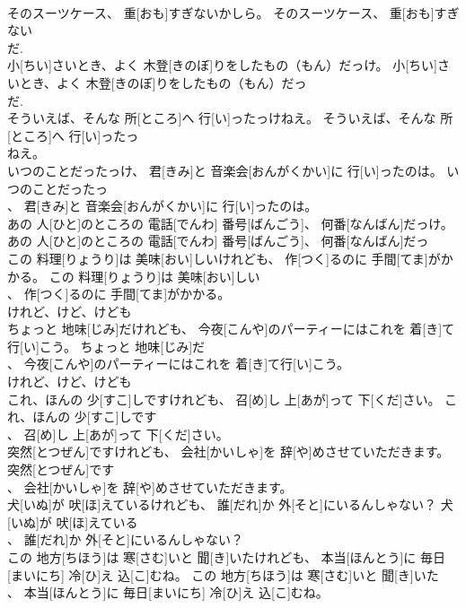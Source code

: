 \documentclass[8pt]{extreport}
\begin{document}
\begin{CJK}{UTF8}{min}
\\	そのスーツケース、 重[おも]すぎないかしら。	そのスーツケース、 重[おも]すぎない
\\	だ. 
\\	小[ちい]さいとき、よく 木登[きのぼ]りをしたもの（もん）だっけ。	小[ちい]さいとき、よく 木登[きのぼ]りをしたもの（もん）だっ
\\	だ. 
\\	そういえば、そんな 所[ところ]へ 行[い]ったっけねえ。	そういえば、そんな 所[ところ]へ 行[い]ったっ
\\	ねえ。	
\\	いつのことだったっけ、 君[きみ]と 音楽会[おんがくかい]に 行[い]ったのは。	いつのことだったっ
\\	、 君[きみ]と 音楽会[おんがくかい]に 行[い]ったのは。	
\\	あの 人[ひと]のところの 電話[でんわ] 番号[ばんごう]、 何番[なんばん]だっけ。	あの 人[ひと]のところの 電話[でんわ] 番号[ばんごう]、 何番[なんばん]だっ
\\	この 料理[りょうり]は 美味[おい]しいけれども、 作[つく]るのに 手間[てま]がかかる。	この 料理[りょうり]は 美味[おい]しい
\\	、 作[つく]るのに 手間[てま]がかかる。	
\\	けれど、けど、けども
\\	ちょっと 地味[じみ]だけれども、 今夜[こんや]のパーティーにはこれを 着[き]て行[い]こう。	ちょっと 地味[じみ]だ
\\	、 今夜[こんや]のパーティーにはこれを 着[き]て行[い]こう。	
\\	けれど、けど、けども
\\	これ、ほんの 少[すこ]しですけれども、 召[め]し 上[あが]って 下[くだ]さい。	これ、ほんの 少[すこ]しです
\\	、 召[め]し 上[あが]って 下[くだ]さい。	
\\	突然[とつぜん]ですけれども、 会社[かいしゃ]を 辞[や]めさせていただきます。	突然[とつぜん]です
\\	、 会社[かいしゃ]を 辞[や]めさせていただきます。	
\\	犬[いぬ]が 吠[ほ]えているけれども、 誰[だれ]か 外[そと]にいるんしゃない？	犬[いぬ]が 吠[ほ]えている
\\	、 誰[だれ]か 外[そと]にいるんしゃない？	
\\	この 地方[ちほう]は 寒[さむ]いと 聞[き]いたけれども、 本当[ほんとう]に 毎日[まいにち] 冷[ひ]え 込[こ]むね。	この 地方[ちほう]は 寒[さむ]いと 聞[き]いた
\\	、 本当[ほんとう]に 毎日[まいにち] 冷[ひ]え 込[こ]むね。	

\end{CJK}
\end{document}
